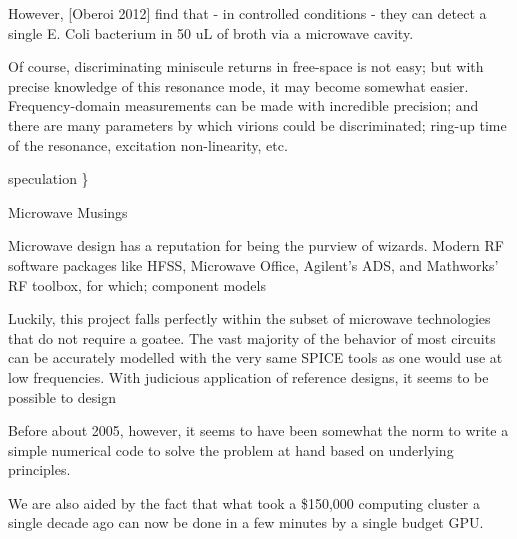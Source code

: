 \documentclass[fleqn,10pt]{article}
\begin{document}
\begin{multicols}{1}
However, [Oberoi 2012] find that - in controlled conditions - they can detect a single E. Coli bacterium in 50 uL of broth via a microwave cavity. 

Of course, discriminating miniscule returns in free-space is not easy; but with precise knowledge of this resonance mode, it may become somewhat easier. Frequency-domain measurements can be made with incredible precision; and there are many parameters by which virions could be discriminated; ring-up time of the resonance, excitation non-linearity, etc.


\end{multicols}

{\color{red} speculation \} } 





\clearpage
{\Large Microwave Musings}\\
\begin{multicols}{1}

\noindent{}
%


Microwave design has a reputation for being the purview of wizards. Modern RF software packages like HFSS, Microwave Office, Agilent's ADS, and Mathworks' RF toolbox, for which; component models 

Luckily, this project falls perfectly within the subset of microwave technologies that do not require a goatee. The vast majority of the behavior of most circuits can be accurately modelled with the very same SPICE tools as one would use at low frequencies. With judicious application of reference designs, it seems to be possible to design 

Before about 2005, however, it seems to have been somewhat the norm to write a simple numerical code to solve the problem at hand based on underlying principles.

We are also aided by the fact that what took a \$150,000 computing cluster a single decade ago can now be done in a few minutes by a single budget GPU.


\end{multicols}
\end{document}
